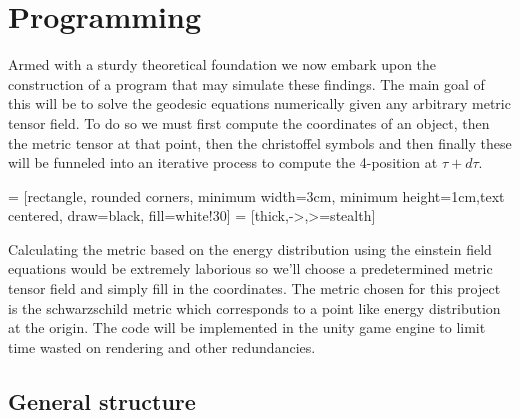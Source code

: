 \documentclass{article}
\begin{document}
  \newpage

  \section{Programming}

Armed with a sturdy theoretical foundation we now embark upon the construction of a program that may simulate these findings. The main goal of this will be to solve the geodesic equations numerically given any arbitrary metric tensor field. To do so we must first compute the coordinates of an object, then the metric tensor at that point, then the christoffel symbols and then finally these will be funneled into an iterative process to compute the 4-position at $\tau+d\tau$.

 = [rectangle, rounded corners, minimum width=3cm, minimum height=1cm,text centered, draw=black, fill=white!30]
 = [thick,->,>=stealth]

\vspace{40pt}
\hspace{15pt}
\bigskip
\bigskip
\newline
Calculating the metric based on the energy distribution using the einstein field equations would be extremely laborious so we'll choose a predetermined metric tensor field and simply fill in the coordinates. The metric chosen for this project is the schwarzschild metric which corresponds to a point like energy distribution at the origin. The code will be implemented in the unity game engine to limit time wasted on rendering and other redundancies.

\newpage
\subsection{General structure}
 
\end{document}

